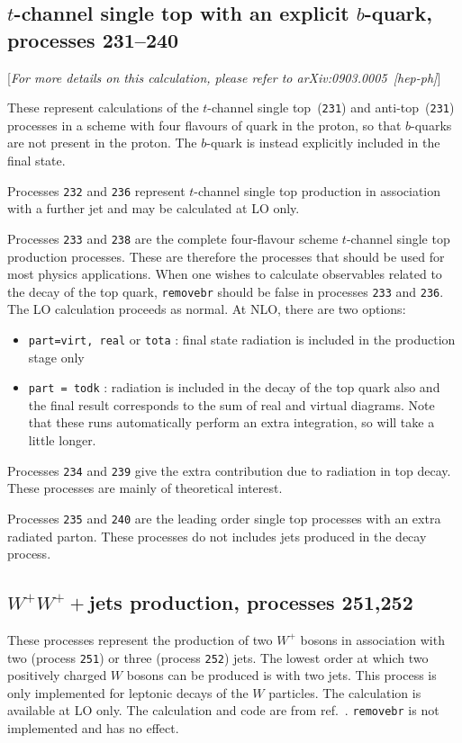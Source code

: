\documentclass[12pt]{article}
\begin{document}
\subsection{$t$-channel single top with an explicit $b$-quark, processes 231--240}
\label{subsec:stopb}

\begin{center}
[{\it For more details on this calculation, please refer to arXiv:0903.0005~[hep-ph]}]
\end{center}

These represent calculations of the $t$-channel single top~({\tt 231}) and anti-top~({\tt 231})
processes in a scheme with four flavours of quark in the proton, so that $b$-quarks are not present in the proton.
The $b$-quark is instead explicitly included in the final state.

Processes {\tt 232} and {\tt 236} represent $t$-channel single top production in association
with a further jet and may be calculated at LO only.

Processes {\tt 233} and {\tt 238} are the complete four-flavour scheme $t$-channel single top production processes.
These are therefore the processes that should be used for most physics applications.
When one wishes to calculate observables related to the decay of the top
quark, {\tt removebr} should be false in processes {\tt 233} and {\tt 236}.
The LO calculation proceeds as normal. At NLO, there are two options:
\begin{itemize}
\item {\tt part=virt, real} or {\tt tota} : final state radiation is included
in the production stage only
\item {\tt part = todk} : radiation is included in the decay of the top
quark also and the final result corresponds to the sum of real and virtual
diagrams. 
Note that these runs automatically perform an extra integration, so
will take a little longer.
\end{itemize}


Processes {\tt 234} and {\tt 239} give the extra contribution due to radiation 
in top decay. These processes are mainly of theoretical interest. 

Processes {\tt 235} and {\tt 240} are the leading order single top processes with an 
extra radiated parton. These processes do not includes jets produced in the decay process.

\subsection{$W^+W^++$jets production, processes 251,252}
These processes represent the production of two $W^+$ 
bosons in association with two (process {\tt 251}) or three (process {\tt 252})
jets.  The lowest order at which two positively charged $W$ bosons 
can be produced is with two jets. 
This process is only implemented for leptonic decays of the 
$W$ particles. The calculation is available at LO only.
The calculation and code are from ref.~\cite{Melia:2010bm}.
{\tt removebr} is not implemented and has no effect.
\end{document}
